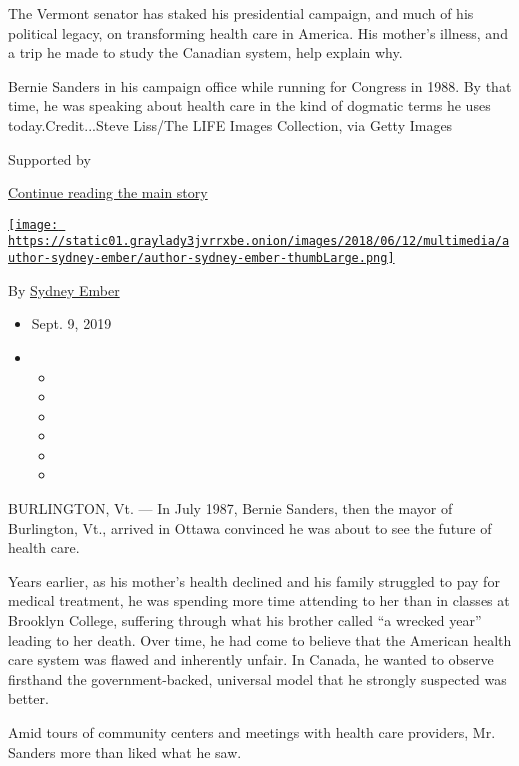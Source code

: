 The Vermont senator has staked his presidential campaign, and much of
his political legacy, on transforming health care in America. His
mother's illness, and a trip he made to study the Canadian system, help
explain why.

Bernie Sanders in his campaign office while running for Congress in
1988. By that time, he was speaking about health care in the kind of
dogmatic terms he uses today.Credit...Steve Liss/The LIFE Images
Collection, via Getty Images

Supported by

\protect\hyperlink{after-sponsor}{Continue reading the main story}

\href{https://www.nytimes3xbfgragh.onion/by/sydney-ember}{\texttt{[image: https://static01.graylady3jvrrxbe.onion/images/2018/06/12/multimedia/author-sydney-ember/author-sydney-ember-thumbLarge.png]}}

By \href{https://www.nytimes3xbfgragh.onion/by/sydney-ember}{Sydney
Ember}

\begin{itemize}
\item
  Sept. 9, 2019
\item
  \begin{itemize}
  \item
  \item
  \item
  \item
  \item
  \item
  \end{itemize}
\end{itemize}

BURLINGTON, Vt. --- In July 1987, Bernie Sanders, then the mayor of
Burlington, Vt., arrived in Ottawa convinced he was about to see the
future of health care.

Years earlier, as his mother's health declined and his family struggled
to pay for medical treatment, he was spending more time attending to her
than in classes at Brooklyn College, suffering through what his brother
called ``a wrecked year'' leading to her death. Over time, he had come
to believe that the American health care system was flawed and
inherently unfair. In Canada, he wanted to observe firsthand the
government-backed, universal model that he strongly suspected was
better.

Amid tours of community centers and meetings with health care providers,
Mr. Sanders more than liked what he saw.

